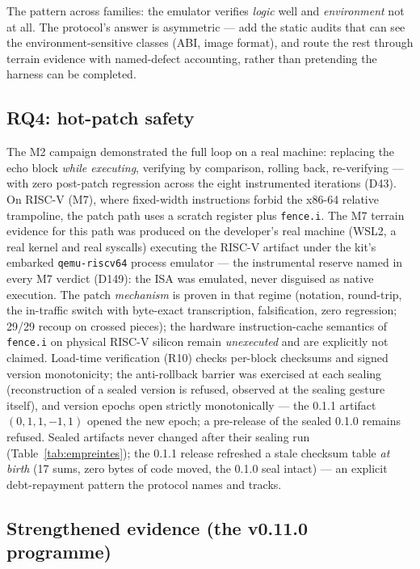 \documentclass[11pt,a4paper]{article}
\newcommand{\code}[1]{\texttt{\small #1}}
\begin{document}
The pattern across families: the emulator verifies \emph{logic} well and
\emph{environment} not at all. The protocol's answer is asymmetric ---
add the static audits that can see the environment-sensitive classes
(ABI, image format), and route the rest through terrain evidence with
named-defect accounting, rather than pretending the harness can be
completed.

\subsection{RQ4: hot-patch safety}\label{sec:rq4}

The M2 campaign demonstrated the full loop on a real machine: replacing
the echo block \emph{while executing}, verifying by comparison,
rolling back, re-verifying --- with zero post-patch regression across the
eight instrumented iterations (D43). On RISC-V (M7), where fixed-width
instructions forbid the x86-64 relative trampoline, the patch path uses
a scratch register plus \code{fence.i}. The M7 terrain evidence for this
path was produced on the developer's real machine (WSL2, a real kernel
and real syscalls) executing the RISC-V artifact under the kit's
embarked \code{qemu-riscv64} process emulator --- the instrumental
reserve named in every M7 verdict (D149): the ISA was emulated, never
disguised as native execution. The patch \emph{mechanism} is proven in
that regime (notation, round-trip, the in-traffic switch with byte-exact
transcription, falsification, zero regression; 29/29 recoup on crossed
pieces); the hardware instruction-cache semantics of \code{fence.i} on
physical RISC-V silicon remain \emph{unexecuted} and are explicitly not
claimed. Load-time verification (R10)
checks per-block checksums and signed version monotonicity; the
anti-rollback barrier was exercised at each sealing (reconstruction of a
sealed version is refused, observed at the sealing gesture itself), and
version epochs open strictly monotonically --- the 0.1.1 artifact
$(0,1,1,-1,1)$ opened the new epoch; a pre-release of the sealed 0.1.0
remains refused. Sealed artifacts never changed after their sealing run
(Table~\ref{tab:empreintes}); the 0.1.1 release refreshed a stale
checksum table \emph{at birth} (17 sums, zero bytes of code moved, the
0.1.0 seal intact) --- an explicit debt-repayment pattern the protocol
names and tracks.

\subsection{Strengthened evidence (the v0.11.0 programme)}\label{sec:renforce}
\end{document}

